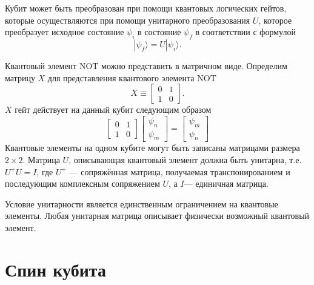 \documentclass[14pt,a4paper]{PhDthesis}
\begin{document}
Кубит может быть преобразован при помощи квантовых логических гейтов, которые осуществляются при помощи унитарного преобразования $U$, которое преобразует исходное состояние $\psi_{i}$ в состояние $\psi_{f}$ в соответствии с формулой
\begin{equation}
|\psi_{f}\rangle = U|\psi_{i}\rangle.
\end{equation}

Квантовый элемент $\mathrm{NOT}$ можно представить в матричном виде. Определим матрицу $X$ для представления квантового элемента $\mathrm{NOT}$
\begin{equation}
X \equiv \begin{bmatrix} 0 & 1 \\ 1 & 0 \end{bmatrix}.
\end{equation}
$X$ гейт действует на данный кубит следующим образом
\begin{equation}
\begin{bmatrix} 0 & 1 \\ 1 & 0 \end{bmatrix} \begin{bmatrix} \psi_{n} \\ \psi_{m} \end{bmatrix} = \begin{bmatrix} \psi_{m} \\ \psi_{n} \end{bmatrix}
\end{equation}
Квантовые элементы на одном кубите могут быть записаны матрицами размера $2 \times 2$. Матрица $U$, описывающая квантовый элемент должна быть унитарна, т.е. $U^{+}U = I$, где $U^{+}$ --- сопряжённая матрица, получаемая транспонированием и последующим комплексным сопряжением $U$, а $I$--- единичная матрица. 

Условие унитарности является единственным ограничением на квантовые элементы. Любая унитарная матрица описывает физически возможный квантовый элемент. 


\section{Спин кубита}
\end{document}
